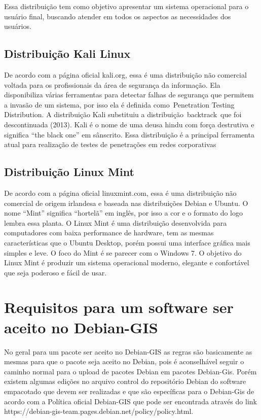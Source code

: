 Essa distribuição tem como objetivo apresentar um sistema operacional para o usuário final, buscando atender em todos os aspectos as necessidades dos usuários.

\subsection{Distribuição Kali Linux}

De acordo com a página oficial kali.org, essa é uma distribuição não comercial voltada para os profissionais da área de segurança da informação. Ela disponibiliza várias ferramentas para detectar falhas de segurança que permitem a invasão de um sistema, por isso ela é definida como Penetration Testing Distribution. A distribuição Kali substituiu a distribuição backtrack que foi descontinuada (2013). Kali é o nome de uma deusa hindu com força destrutiva e significa “the black one” em sânscrito. Essa distribuição é a principal ferramenta atual para realização de testes de penetrações em redes corporativas

\subsection{Distribuição Linux Mint}

De acordo com a página oficial linuxmint.com, essa é uma distribuição não comercial de origem irlandesa e baseada nas distribuições Debian e Ubuntu. O nome “Mint” significa “hortelã” em inglês, por isso a cor e o formato do logo lembra essa planta. O Linux Mint é uma distribuição desenvolvida para computadores com baixa performance de hardware, tem as mesmas características que o Ubuntu Desktop, porém possui uma interface gráfica mais simples e leve. O foco do Mint é se parecer com o Windows 7. O objetivo do Linux Mint é produzir um sistema operacional moderno, elegante e confortável que seja poderoso e fácil de usar.

\section{Requisitos para um software ser aceito no Debian-GIS}

No geral para um pacote ser aceito no Debian-GIS as regras são basicamente as mesmas para que o pacote seja aceito no Debian, pois é aconselhável seguir o caminho normal para o upload de pacotes Debian em pacotes Debian-Gis. Porém existem algumas edições no arquivo control do repositório Debian do software empacotado que devem ser realizadas e que são específicas para o Debian-Gis de acordo com a Política oficial Debian-GIS que pode ser encontrada através do link https://debian-gis-team.pages.debian.net/policy/policy.html.

